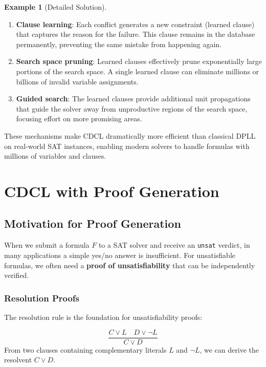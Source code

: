 \documentclass[11pt,a4paper]{article}
\theoremstyle{definition}
\newtheorem{example}{Example}[section]
\theoremstyle{plain}
\theoremstyle{remark}
\begin{document}
\begin{example}[Detailed Solution]
\begin{enumerate}
    \item \textbf{Clause learning}: Each conflict generates a new constraint (learned clause) that captures the reason for the failure. This clause remains in the database permanently, preventing the same mistake from happening again.
    
    \item \textbf{Search space pruning}: Learned clauses effectively prune exponentially large portions of the search space. A single learned clause can eliminate millions or billions of invalid variable assignments.
    
    \item \textbf{Guided search}: The learned clauses provide additional unit propagations that guide the solver away from unproductive regions of the search space, focusing effort on more promising areas.
\end{enumerate}

These mechanisms make CDCL dramatically more efficient than classical DPLL on real-world SAT instances, enabling modern solvers to handle formulas with millions of variables and clauses.
\end{example}



\newpage 

\section{CDCL with Proof Generation}

\subsection{Motivation for Proof Generation}

When we submit a formula $F$ to a SAT solver and receive an \texttt{unsat} verdict, in many applications a simple yes/no answer is insufficient. For unsatisfiable formulas, we often need a \textbf{proof of unsatisfiability} that can be independently verified.

\subsubsection{Resolution Proofs}

The resolution rule is the foundation for unsatisfiability proofs:

\begin{tcolorbox}[colback=blue!5!white,colframe=blue!75!black,title=\textbf{Resolution Rule}]
\[
\frac{C \lor L \quad D \lor \neg L}{C \lor D}
\]
From two clauses containing complementary literals $L$ and $\neg L$, we can derive the resolvent $C \lor D$.
\end{tcolorbox}
\end{document}
